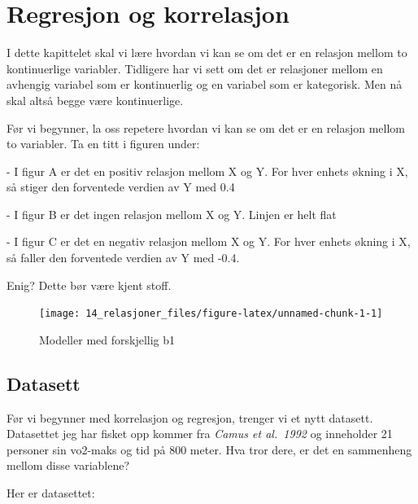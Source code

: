 \documentclass[
]{book}
\begin{document}
\hypertarget{regresjon-og-korrelasjon}{%
\chapter{Regresjon og korrelasjon}\label{regresjon-og-korrelasjon}}

I dette kapittelet skal vi lære hvordan vi kan se om det er en relasjon mellom to kontinuerlige variabler. Tidligere har vi sett om det er relasjoner mellom en avhengig variabel som er kontinuerlig og en variabel som er kategorisk. Men nå skal altså begge være kontinuerlige.

Før vi begynner, la oss repetere hvordan vi kan se om det er en relasjon mellom to variabler. Ta en titt i figuren under:

{ - I figur A er det en positiv relasjon mellom X og Y. For hver enhets økning i X, så stiger den forventede verdien av Y med 0.4}

{- I figur B er det ingen relasjon mellom X og Y. Linjen er helt flat}

{- I figur C er det en negativ relasjon mellom X og Y. For hver enhets økning i X, så faller den forventede verdien av Y med -0.4. }

Enig? Dette bør være kjent stoff.

\begin{figure}

{\centering \texttt{[image: 14\_relasjoner\_files/figure-latex/unnamed-chunk-1-1]} 

}

\caption{Modeller med forskjellig b1}\label{fig:unnamed-chunk-1}
\end{figure}

\hypertarget{datasett-2}{%
\section{Datasett}\label{datasett-2}}

Før vi begynner med korrelasjon og regresjon, trenger vi et nytt datasett. Datasettet jeg har fisket opp kommer fra \emph{Camus et al.~1992} og inneholder 21 personer sin vo2-maks og tid på 800 meter. Hva tror dere, er det en sammenheng mellom disse variablene?

Her er datasettet:
\end{document}
